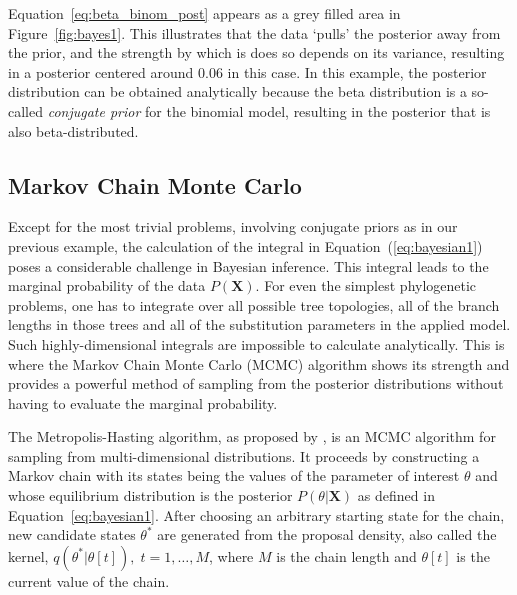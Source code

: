 Equation~\ref{eq:beta_binom_post} appears as a grey filled area in Figure~\ref{fig:bayes1}.
This illustrates that the data `pulls' the posterior away from the prior, and the strength by which is does so depends on its variance, resulting in a posterior centered around 0.06 in this case.
In this example, the posterior distribution can be obtained analytically because the beta distribution is a so-called \emph{conjugate prior} for the binomial model, resulting in the posterior that is also beta-distributed.












\subsection{Markov Chain Monte Carlo\label{sub:mcmc} }

Except for the most trivial problems, involving conjugate priors as in our previous example, the calculation of the integral in Equation~(\ref{eq:bayesian1}) poses a considerable challenge in Bayesian inference.
This integral leads to the marginal probability of the data $P\left(\mathbf{X}\right)$. 
For even the simplest phylogenetic problems, one has to integrate over all possible tree topologies, all of the branch lengths in those trees and all of the substitution parameters in the applied model.
Such highly-dimensional integrals are impossible to calculate analytically.
This is where the Markov Chain Monte Carlo (MCMC) algorithm shows its strength and provides a powerful method of sampling from the posterior distributions without having to evaluate the marginal probability. %

The Metropolis-Hasting algorithm, as proposed by \citet{Metropolis1953}, is an MCMC algorithm for sampling from multi-dimensional distributions.
It proceeds by constructing a Markov chain with its states being the values of the parameter of interest $\theta$ and whose equilibrium distribution is the posterior $P\left(\theta|\mathbf{X}\right)$ as defined in Equation~\ref{eq:bayesian1}.
After choosing an arbitrary starting state for the chain, new candidate states $\theta^{*}$ are generated from the proposal density, also called the kernel, $q(\theta^{*} | \theta[t]), \; t=1,\ldots,M$, where $M$ is the chain length and $\theta[t]$ is the current value of the chain.

